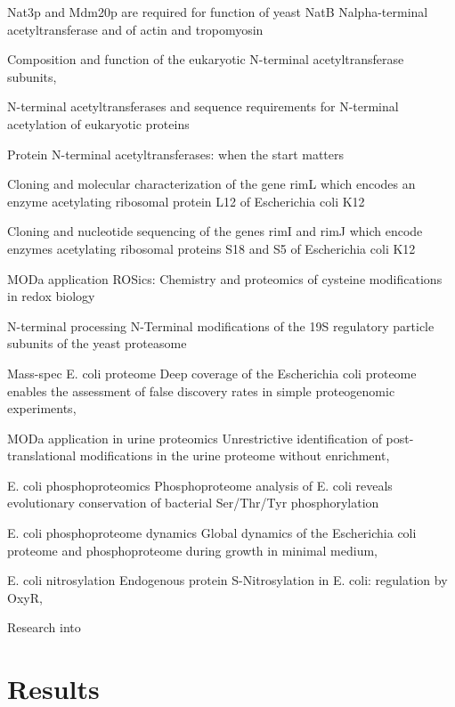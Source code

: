 \documentclass[12pt]{article}
\begin{document}
\cite{Polevodaetal2003}
{Nat3p and Mdm20p are required for function of yeast NatB Nalpha-terminal acetyltransferase and of actin and tropomyosin}
   
\cite{PolevodaSherman2003}
{Composition and function of the eukaryotic N-terminal acetyltransferase subunits},
   
\cite{PolevodaSherman2003b}
{N-terminal acetyltransferases and sequence requirements for N-terminal acetylation of eukaryotic proteins}

\cite{Starheimetal2012}
{Protein N-terminal acetyltransferases: when the start matters}

\cite{Tanakaetal1989}
{Cloning and molecular characterization of the gene rimL which encodes an enzyme acetylating ribosomal protein L12 of Escherichia coli K12}

\cite{Yoshikawaetal1987}
{Cloning and nucleotide sequencing of the genes rimI and rimJ which encode enzymes acetylating ribosomal proteins S18 and S5 of Escherichia coli K12}
   
MODa application \cite{Kimetal2014}
{ROSics: Chemistry and proteomics of cysteine modifications in redox biology}

N-terminal processing \cite{Kimuraetal2003}
{N-Terminal modifications of the 19S regulatory particle subunits of the yeast proteasome}

Mass-spec E. coli proteome \cite{Krugetal2013}
{Deep coverage of the Escherichia coli proteome enables the assessment of false discovery rates in simple proteogenomic experiments},

MODa application in urine proteomics \cite{Liuetal2013}
{Unrestrictive identification of post-translational modifications in the urine proteome without enrichment},

E. coli phosphoproteomics \cite{Maceketal2008}
{Phosphoproteome analysis of E. coli reveals evolutionary conservation of bacterial Ser/Thr/Tyr phosphorylation}

E. coli phosphoproteome dynamics \cite{Soaresetal2013}
{Global dynamics of the Escherichia coli proteome and phosphoproteome during growth in minimal medium},

E. coli nitrosylation \cite{Sethetal2012}
{Endogenous protein S-Nitrosylation in E. coli: regulation by OxyR},


Research into 

\section{Results}
\end{document}
